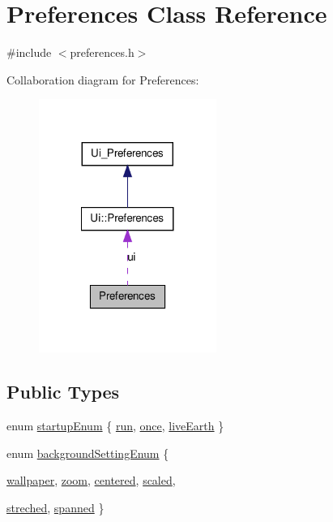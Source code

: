 \hypertarget{classPreferences}{
\section{Preferences Class Reference}
\label{classPreferences}
}


{\ttfamily \#include $<$preferences.h$>$}



Collaboration diagram for Preferences:
\nopagebreak
\begin{figure}[H]
\begin{center}
\leavevmode
\includegraphics[width=164pt]{classPreferences__coll__graph}
\end{center}
\end{figure}
\subsection*{Public Types}
\begin{DoxyCompactItemize}
\item 
enum \hyperlink{classPreferences_a95be5e16f0907d341543bc9b7f396e4e}{startupEnum} \{ \hyperlink{classPreferences_a95be5e16f0907d341543bc9b7f396e4ea85bfd301c96cc6adcb97b466e8591edf}{run}, 
\hyperlink{classPreferences_a95be5e16f0907d341543bc9b7f396e4ea109228307fbc6fc25e01e9916a3b9e27}{once}, 
\hyperlink{classPreferences_a95be5e16f0907d341543bc9b7f396e4ea3ee6d987489659a606564b7a6ba497ad}{liveEarth}
 \}
\item 
enum \hyperlink{classPreferences_ae93d5c2fc6d19e564778f9921a058776}{backgroundSettingEnum} \{ \par
\hyperlink{classPreferences_ae93d5c2fc6d19e564778f9921a058776a9911d049dd17e7b9c51c00f56b7da895}{wallpaper}, 
\hyperlink{classPreferences_ae93d5c2fc6d19e564778f9921a058776a0582bc5a23537f96422e76c1377d680c}{zoom}, 
\hyperlink{classPreferences_ae93d5c2fc6d19e564778f9921a058776aa56270bfded51ede160a3ae2dc88257c}{centered}, 
\hyperlink{classPreferences_ae93d5c2fc6d19e564778f9921a058776a13ae16c1d103e5b48815c004cb7b33f5}{scaled}, 
\par
\hyperlink{classPreferences_ae93d5c2fc6d19e564778f9921a058776a7be613de102c010404ba3f20ca3a4056}{streched}, 
\hyperlink{classPreferences_ae93d5c2fc6d19e564778f9921a058776a517033578f1e263d85fe9945eb6c2079}{spanned}
 \}
\end{DoxyCompactItemize}
